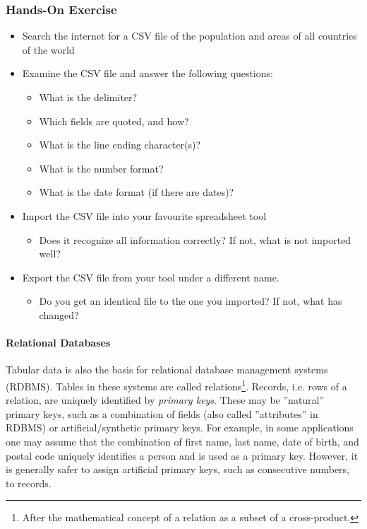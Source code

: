 \begin{tcolorbox}[colback=code]
\subsubsection*{Hands-On Exercise} 

\begin{itemize}
	\item Search the internet for a CSV file of the population and areas of all countries of the world
	\item Examine the CSV file and answer the following questions:
	\begin{itemize}
		\item What is the delimiter?
		\item Which fields are quoted, and how?
		\item What is the line ending character(s)?
		\item What is the number format?
		\item What is the date format (if there are dates)?
	\end{itemize}
	\item Import the CSV file into your favourite spreadsheet tool
	\begin{itemize}
		\item Does it recognize all information correctly? If not, what is not imported well?
	\end{itemize}
	\item Export the CSV file from your tool under a different name.
	\begin{itemize}
		\item Do you get an identical file to the one you imported? If not, what has changed?
	\end{itemize}
\end{itemize}
\end{tcolorbox}

\paragraph*{Relational Databases}

Tabular data is also the basis for relational database management systems (RDBMS). Tables in these systems are called relations\footnote{After the mathematical concept of a relation as a subset of a cross-product.}. Records, i.e. rows of a relation, are uniquely identified by \emph{primary keys}. These may be ''natural'' primary keys, such as a combination of fields (also called ''attributes'' in RDBMS) or artificial/synthetic primary keys. For example, in some applications one may assume that the combination of first name, last name, date of birth, and postal code uniquely identifies a person and is used as a primary key. However, it is generally safer to assign artificial primary keys, such as consecutive numbers, to records. 

